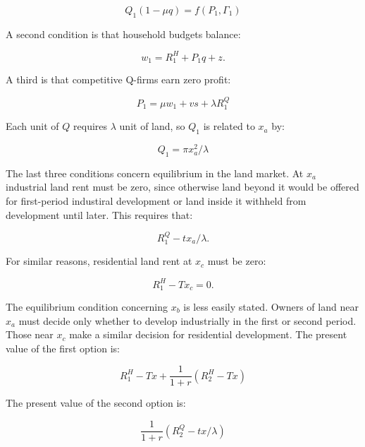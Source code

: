 \begin{equation}
    Q_1 (1 - \mu q) = f(P_1, \Gamma_1)
\end{equation}

A second condition is that household budgets balance:

\begin{equation}
    w_1 = R_1^H + P_1 q + z.
\end{equation}

A third is that competitive Q-firms earn zero profit:

\begin{equation}
    P_1 = \mu w_1 + vs + \lambda R_1^Q
\end{equation}

Each unit of $Q$ requires $\lambda$ unit of land, so $Q_1$ is related to $x_a$ by:

\begin{equation}
    Q_1 = \pi x_a^2 / \lambda
\end{equation}

The last three conditions concern equilibrium in the land market. At $x_a$ industrial land rent must be zero, since otherwise land beyond it would be offered for first-period industiral development or land inside it withheld from development until later. This requires that:

\begin{equation}
    R_1^Q - tx_a / \lambda.
\end{equation}

For similar reasons, residential land rent at $x_c$ must be zero:

\begin{equation}
    R_1^H - Tx_c = 0.
\end{equation}

The equilibrium condition concerning $x_b$ is less easily stated. Owners of land near $x_a$ must decide only whether to develop industrially in the first or second period. Those near $x_c$ make a similar decision for residential development. The present value of the first option is:

\begin{equation*}
    R_1^H - Tx + \frac{1}{1 + r}(R_2^H - Tx)
\end{equation*}

The present value of the second option is:

\begin{equation*}
    \frac{1}{1 + r}(R_2^Q - tx / \lambda)
\end{equation*}

